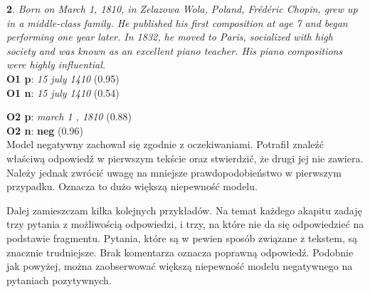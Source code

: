 \textbf{2}. \textit{Born on March 1, 1810, in Zelazowa Wola, Poland, Frédéric Chopin, grew up in a middle-class family. He published his first composition at age 7 and began performing one year later. In 1832, he moved to Paris, socialized with high society and was known as an excellent piano teacher. His piano compositions were highly influential.}\\

\textbf{O1 p}: \textit{15 july 1410} (0.95)\\\indent
\textbf{O1 n}: \textit{15 july 1410} (0.54)

\textbf{O2 p}: \textit{march 1 , 1810} (0.88)\\\indent
\textbf{O2 n}: \textbf{neg} (0.96)\\

\normalsize
Model negatywny zachował się zgodnie z oczekiwaniami. Potrafił znaleźć właściwą odpowiedź w pierwszym tekście oraz stwierdzić, że drugi jej nie zawiera. Należy jednak zwrócić uwagę na mniejsze prawdopodobieństwo w pierwszym przypadku. Oznacza to dużo większą niepewność modelu.

Dalej zamieszczam kilka kolejnych przykładów. Na temat każdego akapitu zadaję trzy pytania z możliwością odpowiedzi, i trzy, na które nie da się odpowiedzieć na podstawie fragmentu. Pytania, które są w pewien sposób związane z tekstem, są znacznie trudniejsze. Brak komentarza oznacza poprawną odpowiedź. Podobnie jak powyżej, można zaobserwować większą niepewność modelu negatywnego na pytaniach pozytywnych.\\\\

